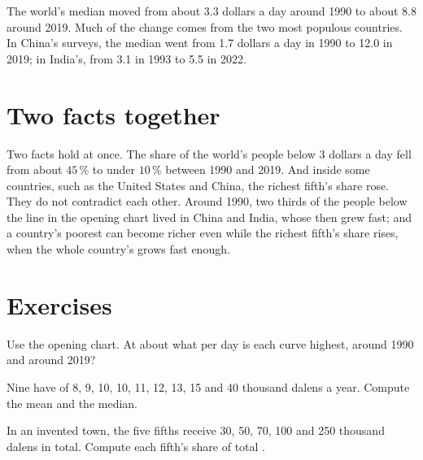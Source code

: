 The world's median moved from about 3.3 dollars a day around 1990 to about 8.8 around 2019. Much of the
change comes from the two most populous countries. In China's surveys, the median went from 1.7 dollars a day
in 1990 to 12.0 in 2019; in India's, from 3.1 in 1993 to 5.5 in 2022.

\section{Two facts together}

Two facts hold at once. The share of the world's people below 3 dollars a day fell from about $45\,\%$ to
under $10\,\%$ between 1990 and 2019. And inside some countries, such as the United States and China, the
richest fifth's share rose. They do not contradict each other. Around 1990, two thirds of the people below the line
in the opening chart lived in China and India, whose  then grew fast; and a country's poorest can become richer even while the richest
fifth's share rises, when the whole country's  grows fast enough.

\section{Exercises}

\begin{exercise}[$\star$]\label{exo:g9:income-distribution:1}
Use the opening chart. At about what  per day is each curve highest, around 1990 and around 2019?
\end{exercise}

\begin{exercise}[$\star$]\label{exo:g9:income-distribution:2}
Nine  have  of 8, 9, 10, 10, 11, 12, 13, 15 and 40 thousand dalens a year. Compute the mean
and the median.
\end{exercise}

\begin{exercise}[$\star$]\label{exo:g9:income-distribution:3}
In an invented town, the five fifths receive 30, 50, 70, 100 and 250 thousand dalens in total. Compute each
fifth's share of total .
\end{exercise}

